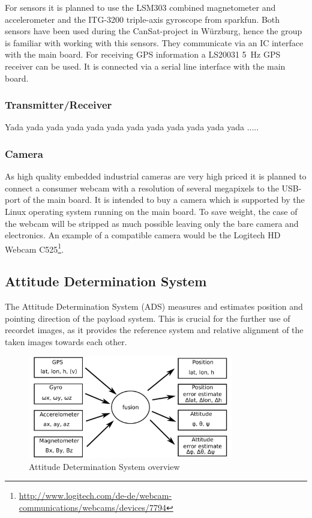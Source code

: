 \documentclass[fontsize=11pt,paper=a4,]{scrartcl}
\begin{document}
For sensors it is planned to use the LSM303 \cite{LSM303:datasheet} combined magnetometer and accelerometer and the ITG-3200 triple-axis gyroscope \cite{ITG-3200:datasheet} from sparkfun. Both sensors have been used during the CanSat-project in Würzburg, hence the group is familiar with working with this sensors. They communicate via an I{\texttwosuperior}C interface with the main board. For receiving GPS information a LS20031 5~Hz GPS receiver \cite{LS20031:datasheet} can be used. It is connected via a serial line interface with the main board.

\subsubsection*{Transmitter/Receiver}

Yada yada yada yada yada yada yada yada yada yada yada yada .....

\subsubsection*{Camera}

As high quality embedded industrial cameras are very high priced it is planned to connect a consumer webcam with a resolution of several megapixels to the USB-port of the main board. It is intended to buy a camera which is supported by the Linux operating system running on the main board. To save weight, the case of the webcam will be stripped as much possible leaving only the bare camera and electronics. An example of a compatible camera would be the Logitech HD Webcam C525\footnote{\url{http://www.logitech.com/de-de/webcam-communications/webcams/devices/7794}}.


\subsection{Attitude Determination System}
The Attitude Determination System (ADS) measures and estimates position and pointing direction of the payload system.
This is crucial for the further use of recordet images, as it provides the reference system and relative alignment of the taken images towards each other.
\begin{figure}
\centering
\includegraphics[width=0.8\textwidth]{figures/ADS_diagram.pdf}
\caption{Attitude Determination System overview}
\label{fig:ADS_overview}
\end{figure}
\end{document}
